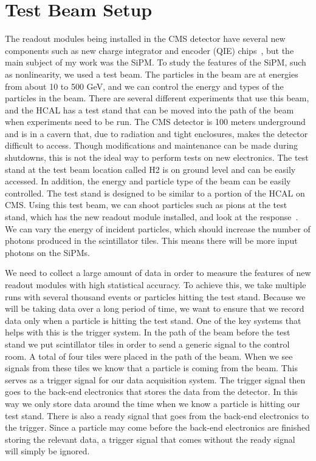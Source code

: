 \section{Test Beam Setup}

The readout modules being installed in the CMS detector have several new components such as new charge integrator and encoder (QIE) chips~\cite{QIE, QIE2}, but the main subject of my work was the SiPM. To study the features of the SiPM,  such as nonlinearity, we used a test beam. The particles in the beam are at energies from about 10 to 500 GeV, and we can control the energy and types of the particles in the beam. There are several different experiments that use this beam, and the HCAL has a test stand that can be moved into the path of the beam when experiments need to be run. The CMS detector is 100 meters underground and is in a cavern that, due to radiation and tight enclosures, makes the detector difficult to access. Though modifications and maintenance can be made during shutdowns, this is not the ideal way to perform tests on new electronics. The test stand at the test beam location called H2 is on ground level and can be easily accessed. In addition, the energy and particle type of the beam can be easily controlled. The test stand is designed to be similar to a portion of the HCAL on CMS. Using this test beam, we can shoot particles such as pions at the test stand, which has the new readout module installed, and look at the response~\cite{TB96, TB06}. We can vary the energy of incident particles, which should increase the number of photons produced in the scintillator tiles. This means there will be more input photons on the SiPMs.

We need to collect a large amount of data in order to measure the features of new readout modules with high statistical accuracy. To achieve this, we take multiple runs with several thousand events or particles hitting the test stand. Because we will be taking data over a long period of time, we want to ensure that we record data only when a particle is hitting the test stand. One of the key systems that helps with this is the trigger system. In the path of the beam before the test stand we put scintillator tiles in order to send a generic signal to the control room. A total of four tiles were placed in the path of the beam. When we see signals from these tiles we know that a particle is coming from the beam. This serves as a trigger signal for our data acquisition system. The trigger signal then goes to the back-end electronics that stores the data from the detector. In this way we only store data around the time when we know a particle is hitting our test stand. There is also a ready signal that goes from the back-end electronics to the trigger. Since a particle may come before the back-end electronics are finished storing the relevant data, a trigger signal that comes without the ready signal will simply be ignored.

